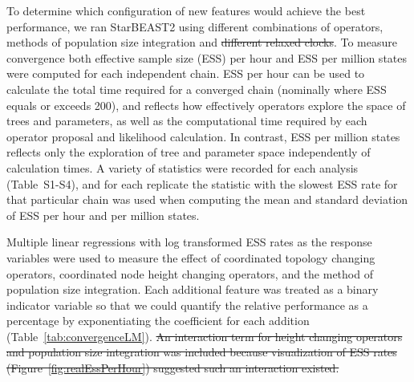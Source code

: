 \documentclass[12pt]{article}
\providecommand{\DIFaddtex}[1]{{\protect\color{blue}\uwave{#1}}} %
\providecommand{\DIFdeltex}[1]{{\protect\color{red}\sout{#1}}}                      %
\providecommand{\DIFaddbegin}{} %
\providecommand{\DIFaddend}{} %
\providecommand{\DIFdelbegin}{} %
\providecommand{\DIFdelend}{} %
\providecommand{\DIFadd}[1]{\texorpdfstring{\DIFaddtex{#1}}{#1}} %
\providecommand{\DIFdel}[1]{\texorpdfstring{\DIFdeltex{#1}}{}} %
\begin{document}
To determine which configuration of new features would achieve the best
performance, we ran StarBEAST2 using different combinations of operators,
methods of population size integration and \DIFdelbegin \DIFdel{different relaxed clocks}\DIFdelend \DIFaddbegin \DIFadd{clock models}\DIFaddend . To measure
convergence both effective sample size (ESS) per hour and ESS per million
states were computed for each independent chain. ESS per hour can be used to
calculate the total time required for a converged chain (nominally where ESS
equals or exceeds 200), and reflects how effectively operators explore the
space of trees and parameters, as well as the computational time required by
each operator proposal and likelihood calculation. In contrast, ESS per
million states reflects only the exploration of tree and parameter space
independently of calculation times. A variety of statistics were recorded for
each analysis (Table~S1-S4), and for each replicate the statistic with the
slowest ESS rate for that particular chain was used when computing the mean
and standard deviation of ESS per hour and per million states.

Multiple linear regressions with log transformed ESS rates as the response
variables were used to measure the effect of coordinated topology changing
operators, coordinated node height changing operators, and the method of
population size integration. Each additional feature was treated as a binary
indicator variable so that we could quantify the relative performance as a
percentage by exponentiating the coefficient for each addition
(Table~\ref{tab:convergenceLM}).
\DIFdelbegin \DIFdel{An interaction term for height changing
operators and population size integration was included because visualization of
ESS rates (Figure~\ref{fig:realEssPerHour}) suggested such an interaction existed.
}\DIFdelend 
\end{document}
